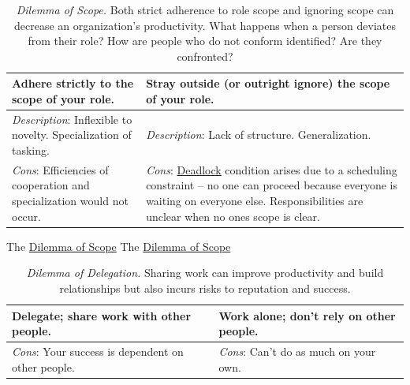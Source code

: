 \begin{center}
\begin{table}[H] %
\begin{tabular}{ | m{\dilemmatablewidth}| m{\dilemmatablewidth} | }
  \hline
  \textbf{Adhere strictly to the scope of your role.} & 
  \textbf{Stray outside (or outright ignore) the scope of your role.} \\ 
  \hline
  \textit{Description}: Inflexible to novelty. Specialization of tasking. & 
  \textit{Description}: Lack of structure. Generalization. \\ 
  \hline
  \textit{Cons}: Efficiencies of cooperation and specialization would not occur. & 
  \textit{Cons}: \href{https://en.wikipedia.org/wiki/Deadlock}{Deadlock} condition arises due to a scheduling constraint -- no one can proceed because everyone is waiting on everyone else. Responsibilities are unclear when no ones scope is clear. \\  
  \hline
\end{tabular}
\caption{
\textit{Dilemma of Scope.}
Both strict adherence to role scope and ignoring scope can decrease an organization's productivity. 
What happens when a person deviates from their role?
How are people who do not conform identified? Are they confronted?
}
\label{table:scope-of-activity}
\end{table}
\end{center}


The \href{table:scope-of-activity}{Dilemma of Scope}
The \href{table:scope-of-activity}{Dilemma of Scope}


\begin{center}
\begin{table}[H] %
\begin{tabular}{ | m{\dilemmatablewidth}| m{\dilemmatablewidth} | } 
  \hline
  \textbf{Delegate; share work with other people.} & 
  \textbf{Work alone; don't rely on other people.} \\ 
  \hline
  \textit{Cons}: Your success is dependent on other people. & 
  \textit{Cons}: Can't do as much on your own. \\  
  \hline
\end{tabular}
\caption{
\textit{Dilemma of Delegation.}
Sharing work can improve productivity and build relationships but also incurs risks to reputation and success.
}
\label{table:delegate-or-not}
\end{table}
\end{center}


